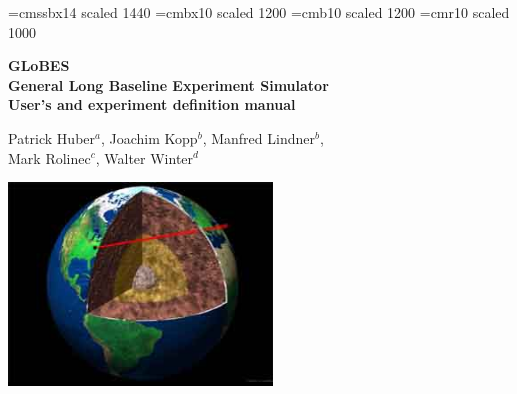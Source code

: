 \documentclass[a4paper,12pt,twoside]{book}
\newcommand{\GLOBES}{{\sf GLoBES}}
\begin{document}
 

\frontmatter
{}
\thispagestyle{empty}
{
\setlength{\parindent}{0cm}


\font\fa=cmssbx14 scaled 1440
\font\fb=cmbx10 scaled 1200
\font\fc=cmb10 scaled 1200
\font\fd=cmr10 scaled 1000  

{\setlength{\baselineskip}{1.2cm}}

\vspace*{1.5cm}

\begin{center}
{ \Large \bf
{\Huge \GLOBES} \\
General Long Baseline Experiment Simulator \\ }
\vspace*{0.5cm}
{\large \bf User's and experiment definition manual }

\end{center}

\vspace{0.5cm}

\begin{center}
{\large Patrick Huber$^a$, Joachim Kopp$^b$, Manfred Lindner$^b$, \\ Mark Rolinec$^c$, Walter Winter$^d$}
\end{center}

\vspace{0.3cm}

\begin{center}





\end{center}

\vspace{0.5cm}

\begin{center}
\colorbox{black}{\includegraphics[width=7cm]{.save/earthint}}


\end{center}}
\end{document}
